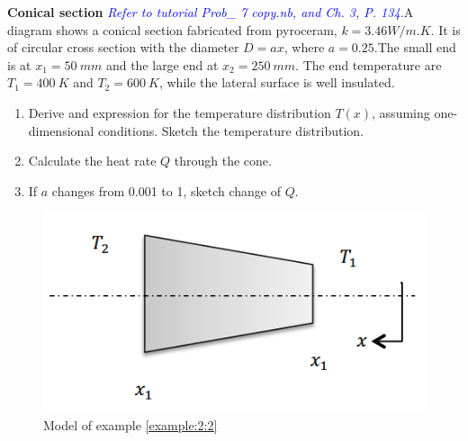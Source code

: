 \begin{example}
\label{example:2:2}
\textbf{Conical section} \textcolor{blue} {\emph{Refer to tutorial 
Prob\_ 7 copy.nb, and Ch. 3, P. 134.}}A diagram shows a conical section 
fabricated from pyroceram, $k=3.46W/m.K$. It is of circular cross section with 
the diameter $D=ax$, where $a=0.25$.The small end is at $x_1=50~mm$ and the large end at $x_2=250~mm$.
The end temperature are $T_1=400~K$ and $T_2=600~K$, while the lateral 
surface is well insulated.
\begin{enumerate}
\item Derive and expression for the temperature distribution $T(x)$,
assuming one-dimensional conditions. Sketch the temperature distribution.
\item Calculate the heat rate $Q$ through the cone.
\item If $a$ changes from 0.001 to 1, sketch change of $Q$.
\end{enumerate}
\begin{figure}[h]
  \centering
    \includegraphics[scale=0.6]{figures/ch2/3}
    \caption{Model of example \ref{example:2:2}}
    \label{fig:2:3}
\end{figure}
\end{example}

